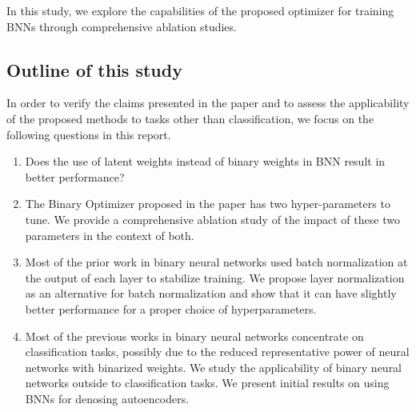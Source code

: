 In this study, we explore the capabilities of the proposed optimizer for training BNNs through comprehensive ablation studies.

\subsection{Outline of this study}
In order to verify the claims presented in the paper and to assess the applicability of the proposed methods to tasks other than classification, we focus on the following questions in this report.
\begin{enumerate}
    \item Does the use of latent weights instead of binary weights in BNN result in better performance?
    \item The Binary Optimizer proposed in the paper has two hyper-parameters to tune. We provide a comprehensive ablation study of the impact of these two parameters in the context of both.
    \item Most of the prior work in binary neural networks used batch normalization at the output of each layer to stabilize training. We propose layer normalization as an alternative for batch normalization and show that it can have slightly better performance for a proper choice of hyperparameters.
   
    \item Most of the previous works in binary neural networks concentrate on classification tasks, possibly due to the reduced representative power of neural networks with binarized weights. We study the applicability of binary neural networks outside to classification tasks. We present initial results on using BNNs for denosing autoencoders.
\end{enumerate}